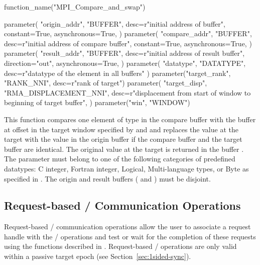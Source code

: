 %
%
\begin{mpi-binding}
    function_name("MPI_Compare_and_swap")

    parameter(
        "origin_addr",
        "BUFFER",
        desc=r"initial address of buffer",
        constant=True,
        asynchronous=True,
    )
    parameter(
        "compare_addr",
        "BUFFER",
        desc=r"initial address of compare buffer",
        constant=True,
        asynchronous=True,
    )
    parameter(
        "result_addr",
        "BUFFER",
        desc=r"initial address of result buffer",
        direction="out",
        asynchronous=True,
    )
    parameter(
        "datatype", "DATATYPE", desc=r"datatype of the element in all buffers"
    )
    parameter("target_rank", "RANK_NNI", desc=r"rank of target")
    parameter(
        "target_disp",
        "RMA_DISPLACEMENT_NNI",
        desc=r"displacement from start of window to beginning of target buffer",
    )
    parameter("win", "WINDOW")
\end{mpi-binding}


This function compares one element of type  in the
compare buffer  with the buffer at offset
 in the target window specified by
 and  and replaces the
value at the target with the value in the origin buffer
 if the compare buffer and the 
target buffer are identical.
The original value at the target is returned
in the buffer . The parameter 
must belong to one of the following categories of predefined datatypes: C integer, Fortran
integer, Logical, Multi-language types, or Byte as specified in
.
The origin and result buffers ( and
) must be disjoint. 


\subsection{Request-based \texorpdfstring{\RMA/}{RMA} Communication Operations}
\label{sec:1sided-req}

Request-based \RMA/ communication operations allow the user to
associate a request handle with the \RMA/ operations and test or wait
for the completion of these requests using the functions described in
. Request-based \RMA/ operations
are only valid within a passive target
epoch (see Section~\ref{sec:1sided-sync}). 

